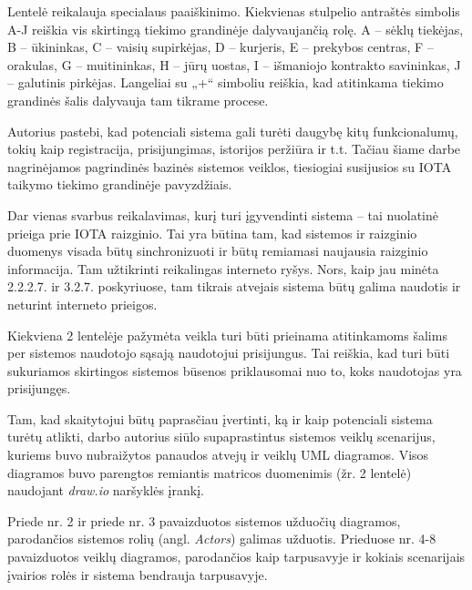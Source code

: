 Lentelė reikalauja specialaus paaiškinimo. Kiekvienas stulpelio antraštės simbolis A-J reiškia vis skirtingą tiekimo grandinėje dalyvaujančią rolę. A – sėklų tiekėjas, B – ūkininkas, C – vaisių supirkėjas, D – kurjeris, E – prekybos centras, F – orakulas, G – muitininkas, H – jūrų uostas, I – išmaniojo kontrakto savininkas, J – galutinis pirkėjas. Langeliai su „+“ simboliu reiškia, kad atitinkama tiekimo grandinės šalis dalyvauja tam tikrame procese.

Autorius pastebi, kad potenciali sistema gali turėti daugybę kitų funkcionalumų, tokių kaip registracija, prisijungimas, istorijos peržiūra ir t.t. Tačiau šiame darbe nagrinėjamos pagrindinės bazinės sistemos veiklos, tiesiogiai susijusios su IOTA taikymo tiekimo grandinėje pavyzdžiais. 

Dar vienas svarbus reikalavimas, kurį turi įgyvendinti sistema – tai nuolatinė prieiga prie IOTA raizginio. Tai yra būtina tam, kad sistemos ir raizginio duomenys visada būtų sinchronizuoti ir būtų remiamasi naujausia raizginio informacija. Tam užtikrinti reikalingas interneto ryšys. Nors, kaip jau minėta 2.2.2.7. ir 3.2.7. poskyriuose, tam tikrais atvejais sistema būtų galima naudotis ir neturint interneto prieigos.

Kiekviena 2 lentelėje pažymėta veikla turi būti prieinama atitinkamoms šalims per sistemos naudotojo sąsają naudotojui prisijungus. Tai reiškia, kad turi būti sukuriamos skirtingos sistemos būsenos priklausomai nuo to, koks naudotojas yra prisijungęs. 

Tam, kad skaitytojui būtų paprasčiau įvertinti, ką ir kaip potenciali sistema turėtų atlikti, darbo autorius siūlo supaprastintus sistemos veiklų scenarijus, kuriems buvo nubraižytos panaudos atvejų ir veiklų UML diagramos. Visos diagramos buvo parengtos remiantis matricos duomenimis (žr. 2 lentelė) naudojant \textit{draw.io} naršyklės įrankį. 

Priede nr. 2 ir priede nr. 3 pavaizduotos sistemos užduočių diagramos, parodančios sistemos rolių (angl. \textit{Actors}) galimas užduotis. Prieduose nr. 4-8 pavaizduotos veiklų diagramos, parodančios kaip tarpusavyje ir kokiais scenarijais įvairios rolės ir sistema bendrauja tarpusavyje.